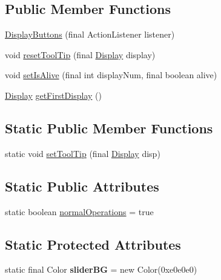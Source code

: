 \subsection*{Public Member Functions}
\begin{DoxyCompactItemize}
\item 
\hyperlink{classgov_1_1fnal_1_1ppd_1_1dd_1_1changer_1_1DisplayButtons_a3ac04af83dc6cf06f9189b85817c6e2f}{Display\-Buttons} (final Action\-Listener listener)
\item 
void \hyperlink{classgov_1_1fnal_1_1ppd_1_1dd_1_1changer_1_1DisplayButtons_ac924a30ee1e2898ea503268668d26806}{reset\-Tool\-Tip} (final \hyperlink{interfacegov_1_1fnal_1_1ppd_1_1dd_1_1signage_1_1Display}{Display} display)
\item 
void \hyperlink{classgov_1_1fnal_1_1ppd_1_1dd_1_1changer_1_1DisplayButtons_ac3046bb71b1529e3afc7bf5395495176}{set\-Is\-Alive} (final int display\-Num, final boolean alive)
\item 
\hyperlink{interfacegov_1_1fnal_1_1ppd_1_1dd_1_1signage_1_1Display}{Display} \hyperlink{classgov_1_1fnal_1_1ppd_1_1dd_1_1changer_1_1DisplayButtons_a98d2836ddfbad3b37a3e21fdf3c5f8d2}{get\-First\-Display} ()
\end{DoxyCompactItemize}
\subsection*{Static Public Member Functions}
\begin{DoxyCompactItemize}
\item 
static void \hyperlink{classgov_1_1fnal_1_1ppd_1_1dd_1_1changer_1_1DisplayButtons_a2ed67969ae9a00aa1c744c2862a53307}{set\-Tool\-Tip} (final \hyperlink{interfacegov_1_1fnal_1_1ppd_1_1dd_1_1signage_1_1Display}{Display} disp)
\end{DoxyCompactItemize}
\subsection*{Static Public Attributes}
\begin{DoxyCompactItemize}
\item 
static boolean \hyperlink{classgov_1_1fnal_1_1ppd_1_1dd_1_1changer_1_1DisplayButtons_aee30976132133400c5f8cb6a48599aa9}{normal\-Operations} = true
\end{DoxyCompactItemize}
\subsection*{Static Protected Attributes}
\begin{DoxyCompactItemize}
\item 
\hypertarget{classgov_1_1fnal_1_1ppd_1_1dd_1_1changer_1_1DisplayButtons_ab2b83431c13a58c3f26a01086ec4ac8d}{static final Color {\bfseries slider\-B\-G} = new Color(0xe0e0e0)}\label{classgov_1_1fnal_1_1ppd_1_1dd_1_1changer_1_1DisplayButtons_ab2b83431c13a58c3f26a01086ec4ac8d}

\end{DoxyCompactItemize}



